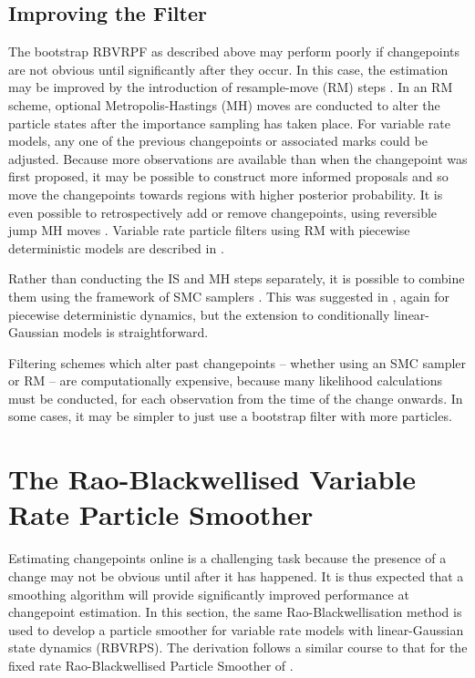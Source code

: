 \documentclass[journal]{IEEEtran}
\begin{document}
\subsection{Improving the Filter}

The bootstrap RBVRPF as described above may perform poorly if changepoints are not obvious until significantly after they occur. In this case, the estimation may be improved by the introduction of resample-move (RM) steps \cite{Gilks2001}. In an RM scheme, optional Metropolis-Hastings (MH) moves are conducted to alter the particle states after the importance sampling has taken place. For variable rate models, any one of the previous changepoints or associated marks could be adjusted. Because more observations are available than when the changepoint was first proposed, it may be possible to construct more informed proposals and so move the changepoints towards regions with higher posterior probability. It is even possible to retrospectively add or remove changepoints, using reversible jump MH moves \cite{Green1995}. Variable rate particle filters using RM with piecewise deterministic models are described in \cite{Whiteley2011,Gilholm2008}.

Rather than conducting the IS and MH steps separately, it is possible to combine them using the framework of SMC samplers \cite{DelMoral2006}. This was suggested in \cite{Whiteley2011}, again for piecewise deterministic dynamics, but the extension to conditionally linear-Gaussian models is straightforward.

Filtering schemes which alter past changepoints -- whether using an SMC sampler or RM -- are computationally expensive, because many likelihood calculations must be conducted, for each observation from the time of the change onwards. In some cases, it may be simpler to just use a bootstrap filter with more particles.



\section{The Rao-Blackwellised Variable Rate Particle Smoother} \label{sec:rbvrps}

Estimating changepoints online is a challenging task because the presence of a change may not be obvious until after it has happened. It is thus expected that a smoothing algorithm will provide significantly improved performance at changepoint estimation. In this section, the same Rao-Blackwellisation method is used to develop a particle smoother for variable rate models with linear-Gaussian state dynamics (RBVRPS). The derivation follows a similar course to that for the fixed rate Rao-Blackwellised Particle Smoother of \cite{Sarkka2012}.
\end{document}
